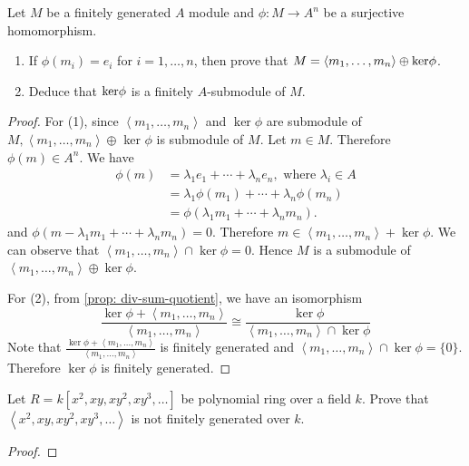 \begin{exercise}
Let $M$ be a finitely generated $A$ module and $\phi: M \rightarrow A^n$ be a surjective homomorphism.
\begin{enumerate}
    \item If $\phi\left(m_i\right)=e_i$ for $i=1, \ldots, n$, then prove that $M=\left\langle m_1, \ldots, m_n\right\rangle \oplus {\operatorname{\text{ker\/}}} \phi$.
    \item Deduce that ${\operatorname{\text{ker\/}}} \phi$ is a finitely $A$-submodule of $M$.
\end{enumerate}
\end{exercise}
\begin{proof}
For (1), since $\left\langle m_1, \ldots, m_n\right\rangle$ and $\operatorname{ker} \phi$ are submodule of $M,\left\langle m_1, \ldots, m_n\right\rangle \oplus$ ker $\phi$ is submodule of $M$. Let $m \in M$. Therefore $\phi(m) \in A^n$. We have
$$
\begin{aligned}
\phi(m) & =\lambda_1 e_1+\cdots+\lambda_n e_n, \text { where } \lambda_i \in A \\
& =\lambda_1 \phi\left(m_1\right)+\cdots+\lambda_n \phi\left(m_n\right) \\
& =\phi\left(\lambda_1 m_1+\cdots+\lambda_n m_n\right) .
\end{aligned}
$$
and $\phi\left(m-\lambda_1 m_1+\cdots+\lambda_n m_n\right)=0$. Therefore $m \in\left\langle m_1, \ldots, m_n\right\rangle+\operatorname{ker} \phi$. We can observe that $\left\langle m_1, \ldots, m_n\right\rangle \cap \operatorname{ker} \phi=0$. Hence $M$ is a submodule of $\left\langle m_1, \ldots, m_n\right\rangle \oplus \operatorname{ker} \phi$.

For (2), from \cref{prop: div-sum-quotient}, we have an isomorphism
$$
\frac{\operatorname{ker} \phi+\left\langle m_1, \ldots, m_n\right\rangle}{\left\langle m_1, \ldots, m_n\right\rangle} \cong \frac{\operatorname{ker} \phi}{\left\langle m_1, \ldots, m_n\right\rangle \cap \operatorname{ker} \phi}
$$
Note that $\frac{\operatorname{ker} \phi+\left\langle m_1, \ldots, m_n\right\rangle}{\left\langle m_1, \ldots, m_n\right\rangle}$ is finitely generated and $\left\langle m_1, \ldots, m_n\right\rangle \cap \operatorname{ker} \phi=\{0\}$. Therefore $\operatorname{ker} \phi$ is finitely generated.
\end{proof}

\begin{exercise}
Let $R=k\left[x^2, x y, x y^2, x y^3, \ldots\right]$ be polynomial ring over a field $k$. Prove that $\left\langle x^2, x y, x y^2, x y^3, \ldots\right\rangle$ is not finitely generated over $k$.
\end{exercise}
\begin{proof}

\end{proof}

